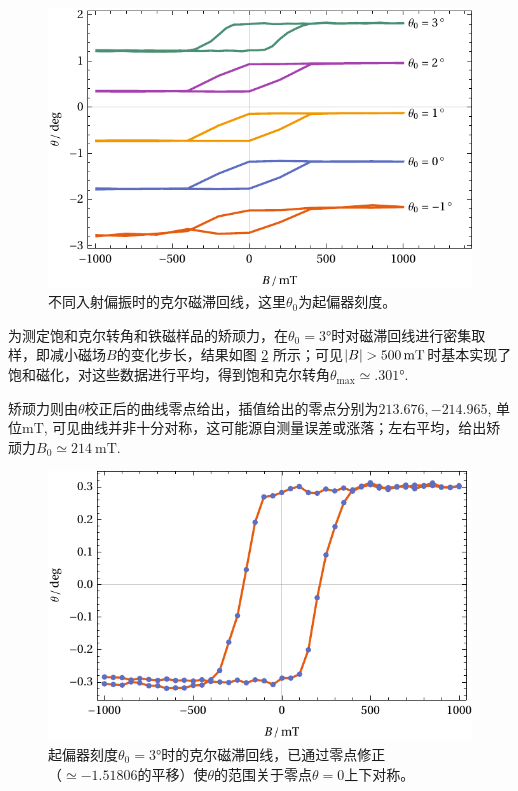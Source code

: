 \documentclass[aps,pre,12pt,preprint,%
	onecolumn,showpacs,showkeys,nofootinbib]{revtex4-1}
\begin{document}
	\begin{figure}[!ht]
		\centering\small
		\includegraphics[width=.75\linewidth]{data/plots/hysteresisCurves.pdf}
		\hspace{3em}
		\caption[不同入射偏振时的克尔磁滞回线]{
			不同入射偏振时的克尔磁滞回线，这里$\theta_0$为起偏器刻度。
		}
		\label{fig:hysteresis}
	\end{figure}
	
	为测定饱和克尔转角和铁磁样品的矫顽力，在$\theta_0 = \ang{3}$时对磁滞回线进行密集取样，即减小磁场$B$的变化步长，结果如图 \ref{fig:hysteresisDetailed} 所示；可见$\abs{B} > \SI{500}{\milli\tesla}$时基本实现了饱和磁化，对这些数据进行平均，得到饱和克尔转角$\theta_{\max} \simeq \ang{.301}$. 
	
	矫顽力则由$\theta$校正后的曲线零点给出，插值给出的零点分别为$213.676,-214.965$, 单位$\si{\milli\tesla}$, 可见曲线并非十分对称，这可能源自测量误差或涨落；左右平均，给出矫顽力$B_0\simeq \SI{214}{\milli\tesla}$. 
	
	\begin{figure}[!ht]
		\centering\small
		\includegraphics[width=.75\linewidth]{data/plots/hysteresisDetails.pdf}
		\hspace{3em}
		\caption[$\theta_0 = \ang{3}$时的克尔磁滞回线]{
			起偏器刻度$\theta_0 = \ang{3}$时的克尔磁滞回线，已通过零点修正\\
			（$\simeq -1.51806$的平移）使$\theta$的范围关于零点$\theta = 0$上下对称。
		}
		\label{fig:hysteresisDetailed}
	\end{figure}
\end{document}

